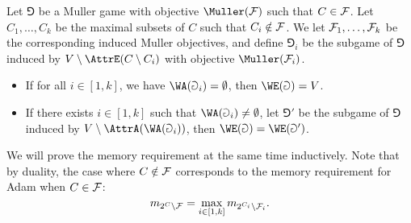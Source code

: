 \begin{lemma}\label{2-lem:McNaughton_Zielonka_even}
Let $\Game$ be a Muller game with objective $\Muller(\F)$ such that $C \in \mathcal{F}$.
Let $C_1, \dots, C_k$ be the maximal subsets of $C$ such that $C_i \notin \mathcal{F}$.
We let $\mathcal{F}_1,\dots,\mathcal{F}_k$ be the corresponding induced Muller objectives,
and define $\Game_i$ be the subgame of $\Game$ induced by $V \setminus \AttrE(C \setminus C_i)$
with objective $\Muller(\F_i)$.
\begin{itemize}
	\item If for all $i \in [1,k]$, we have $\WA(\Game_i) = \emptyset$, then $\WE(\Game) = V$.
	\item If there exists $i \in [1,k]$ such that $\WA(\Game_i) \neq \emptyset$,
	let $\Game'$ be the subgame of $\Game$ induced by $V \setminus \AttrA( \WA(\Game_i) )$,
	then $\WE(\Game) = \WE(\Game')$.
\end{itemize}
\end{lemma}

We will prove the memory requirement at the same time inductively.
Note that by duality, the case where $C \notin \mathcal{F}$ corresponds to the memory requirement for Adam when $C \in \mathcal{F}$:
\[
m_{2^C \setminus \mathcal{F}} = \max_{i \in [1,k]} m_{2^{C_i} \setminus \mathcal{F}_i}.
\]

